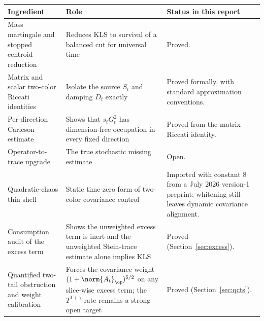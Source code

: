 \documentclass[../../main.tex]{subfiles}
\begin{document}
\begin{center}
\begin{tabularx}{\textwidth}{@{}>{\raggedright\arraybackslash}p{}>{\raggedright\arraybackslash}p{}Y@{}}
\toprule
Ingredient & Role & Status in this report \\
\midrule
Mass martingale and stopped centroid reduction & Reduces KLS to survival of a balanced cut for universal time & Proved. \\
\addlinespace
Matrix and scalar two-color Riccati identities & Isolate the source $S_t$ and damping $D_t$ exactly & Proved formally, with standard approximation conventions. \\
\addlinespace
Per-direction Carleson estimate & Shows that $s_tG_t^2$ has dimension-free occupation in every fixed direction & Proved from the matrix Riccati identity. \\
\addlinespace
Operator-to-trace upgrade & The true stochastic missing estimate & Open. \\
\addlinespace
Quadratic-chaos thin shell & Static time-zero form of two-color covariance control & Imported with constant $8$ from a July 2026 version-1 preprint; whitening still leaves dynamic covariance alignment. \\
\addlinespace
Consumption audit of the excess term & Shows the unweighted excess term is inert and the unweighted Stein-trace estimate alone implies KLS & Proved (Section~\ref{sec:excess}). \\
\addlinespace
Quantified two-tail obstruction and weight calibration & Forces the covariance weight $(1+\norm{A_t}_\op)^{5/2}$ on any slice-wise excess term; the $T^{1+\gamma}$ rate remains a strong open target & Proved (Section~\ref{sec:qcts}). \\
\bottomrule
\end{tabularx}
\end{center}
\end{document}
